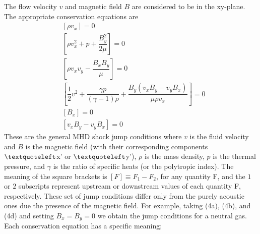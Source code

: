 The flow velocity $v$ and magnetic field $B$ are considered to be in the xy-plane. The appropriate conservation  equations are
\begin{subequations}
\begin{align}
&[\rho v_{x}]=0 \\
&[\rho v_{x}^2+p+\dfrac{B_{y}^2}{2\mu}]=0 \\
&[\rho v_{x}v_{y} - \dfrac{B_{x}B_{y}}{\mu}]=0 \\
&[\dfrac{1}{2}v^2 + \dfrac{\gamma p}{(\gamma-1) \rho}+\dfrac{ B_{y}(v_{x}B_{y} - v_{y}B_{x})}{\mu \rho v_{x}} ]=0 \\
&[B_{x}]=0 \\
&[v_{x}B_{y} - v_{y}B_{x}]=0 
\end{align}
\end{subequations}
These are the general MHD shock jump conditions where $v$ is the fluid velocity and $B$ is the magnetic field (with their corresponding components $\textquoteleft$x' or $\textquoteleft$y'), $\rho$ is the mass density, $p$ is the thermal pressure, and $\gamma$ is the ratio of specific heats (or the polytropic index). The meaning of the square brackets is $[F]\equiv F_{1}-F_{2}$, for any quantity F, and the $1$ or $2$ subscripts represent upstream or downstream values of each quantity F, respectively. These set of jump conditions differ only from the purely acoustic ones due the presence of the magnetic field. For example, taking (4a), (4b), and (4d) and setting $B_{x}=B_{y}=0$ we obtain the jump conditions for a neutral gas. Each conservation equation has a specific meaning; 
